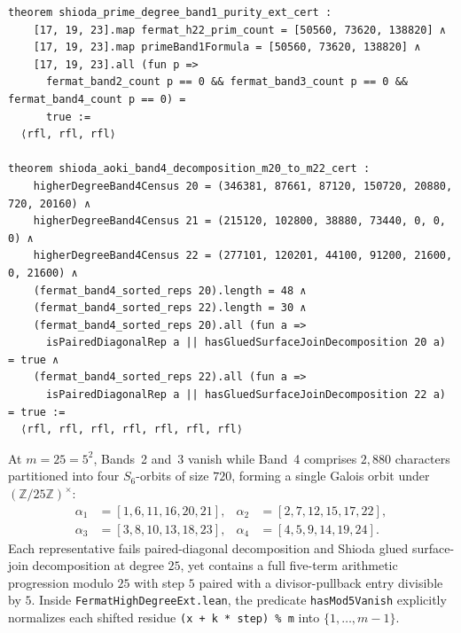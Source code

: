 \documentclass[11pt,a4paper]{article}
\begin{document}
\begin{lstlisting}[caption={Prime purity ($p \in \{17,19,23\}$) and composite $m = 20, 21, 22$ Band-4 certificates in \texttt{FermatHighDegreeExt.lean}.}]
theorem shioda_prime_degree_band1_purity_ext_cert :
    [17, 19, 23].map fermat_h22_prim_count = [50560, 73620, 138820] ∧
    [17, 19, 23].map primeBand1Formula = [50560, 73620, 138820] ∧
    [17, 19, 23].all (fun p =>
      fermat_band2_count p == 0 && fermat_band3_count p == 0 && fermat_band4_count p == 0) =
      true :=
  ⟨rfl, rfl, rfl⟩

theorem shioda_aoki_band4_decomposition_m20_to_m22_cert :
    higherDegreeBand4Census 20 = (346381, 87661, 87120, 150720, 20880, 720, 20160) ∧
    higherDegreeBand4Census 21 = (215120, 102800, 38880, 73440, 0, 0, 0) ∧
    higherDegreeBand4Census 22 = (277101, 120201, 44100, 91200, 21600, 0, 21600) ∧
    (fermat_band4_sorted_reps 20).length = 48 ∧
    (fermat_band4_sorted_reps 22).length = 30 ∧
    (fermat_band4_sorted_reps 20).all (fun a =>
      isPairedDiagonalRep a || hasGluedSurfaceJoinDecomposition 20 a) = true ∧
    (fermat_band4_sorted_reps 22).all (fun a =>
      isPairedDiagonalRep a || hasGluedSurfaceJoinDecomposition 22 a) = true :=
  ⟨rfl, rfl, rfl, rfl, rfl, rfl, rfl⟩
\end{lstlisting}

At $m = 25 = 5^2$, Bands~2 and~3 vanish while Band~4 comprises $2{,}880$ characters partitioned into four $S_6$-orbits of size $720$, forming a single Galois orbit under $(\mathbb{Z}/25\mathbb{Z})^\times$:
\begin{equation}
  \begin{aligned}
    \alpha_1 &= [1, 6, 11, 16, 20, 21], & \alpha_2 &= [2, 7, 12, 15, 17, 22], \\
    \alpha_3 &= [3, 8, 10, 13, 18, 23], & \alpha_4 &= [4, 5, 9, 14, 19, 24].
  \end{aligned}
\end{equation}
Each representative fails paired-diagonal decomposition and Shioda glued surface-join decomposition at degree $25$, yet contains a full five-term arithmetic progression modulo $25$ with step $5$ paired with a divisor-pullback entry divisible by $5$. Inside \texttt{FermatHighDegreeExt.lean}, the predicate \texttt{hasMod5Vanish} explicitly normalizes each shifted residue \texttt{(x + k * step) \% m} into $\{1,\dots,m-1\}$.
\end{document}
